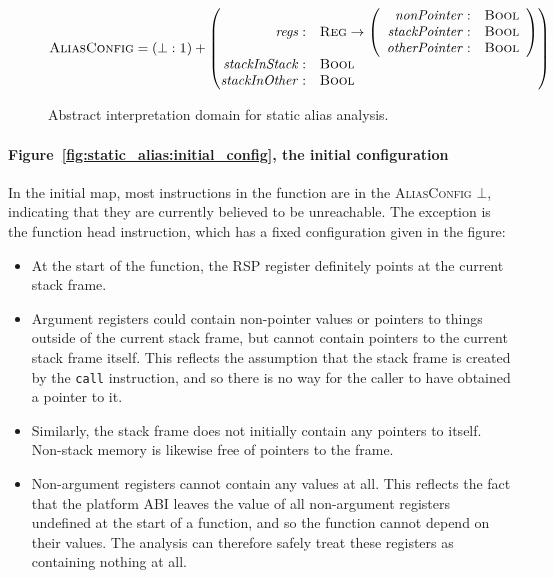 \begin{figure}
  \begin{displaymath}
    \textsc{AliasConfig} = (\bot: \textsc{1}) + \left(\!\!\!\begin{array}{rl}%
      \mathit{regs}         :& \textsc{Reg} \rightarrow \left(\begin{array}{rl}%
        \mathit{nonPointer}   :& \textsc{Bool}\\
        \mathit{stackPointer} :& \textsc{Bool}\\
        \mathit{otherPointer} :& \textsc{Bool}
      \end{array}\right)\!\!\!\\
      \mathit{stackInStack} :& \textsc{Bool} \\
      \mathit{stackInOther} :& \textsc{Bool}
    \end{array}\right)
  \end{displaymath}
  \caption{Abstract interpretation domain for static alias analysis.}
  \label{fig:static_alias:abstract_domain}
\end{figure}

\paragraph{Figure~\ref{fig:static_alias:initial_config}, the initial configuration}

In the initial map, most instructions in the function are in
the \textsc{AliasConfig} $\bot$, indicating that they are currently
believed to be unreachable.  The exception is the function head
instruction, which has a fixed configuration given in the figure:

\begin{itemize}
\item At the start of the function, the \textsc{RSP} register
  definitely points at the current stack frame.
\item Argument registers could contain non-pointer values or pointers
  to things outside of the current stack frame, but cannot contain
  pointers to the current stack frame itself.  This reflects the
  assumption that the stack frame is created by the \texttt{call}
  instruction, and so there is no way for the caller to have obtained
  a pointer to it.
\item Similarly, the stack frame does not initially contain any
  pointers to itself.  Non-stack memory is likewise free of pointers
  to the frame.
\item Non-argument registers cannot contain any values at all.  This
  reflects the fact that the platform ABI leaves the value of all
  non-argument registers undefined at the start of a function, and so
  the function cannot depend on their values.  The analysis can
  therefore safely treat these registers as containing nothing at all.
\end{itemize}

